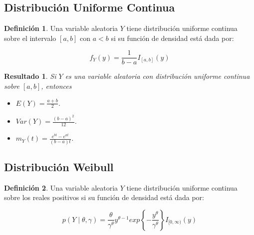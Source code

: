 \documentclass[
  10pt,
  spanish,
]{book}
\providecommand{\tightlist}{%
  \setlength{\itemsep}{0pt}\setlength{\parskip}{0pt}}
\newtheorem{proposition}{Resultado}[chapter]
\theoremstyle{definition}
\newtheorem{definition}{Definición}[chapter]
\theoremstyle{definition}
\theoremstyle{definition}
\theoremstyle{definition}
\theoremstyle{remark}
\begin{document}
\hypertarget{distribuciuxf3n-uniforme-continua}{%
\subsection{Distribución Uniforme Continua}\label{distribuciuxf3n-uniforme-continua}}

\begin{definition}
\protect\hypertarget{def:unnamed-chunk-16}{}{\label{def:unnamed-chunk-16} }Una variable aleatoria \(Y\) tiene distribución uniforme continua sobre el intervalo \([a,b]\) con \(a<b\) si su función de densidad está dada por:

\begin{equation}
f_Y(y)=\frac{1}{b-a}I_{[a,b]}(y)
\end{equation}
\end{definition}

\begin{proposition}
\protect\hypertarget{prp:unnamed-chunk-17}{}{\label{prp:unnamed-chunk-17} }Si \(Y\) es una variable aleatoria con distribución uniforme continua sobre \([a,b]\), entonces

\begin{itemize}
\tightlist
\item
  \(E(Y)=\frac{a+b}{2}\).
\item
  \(Var(Y)=\frac{(b-a)^2}{12}\).
\item
  \(m_Y(t)=\frac{e^{bt}-e^{at}}{(b-a)t}\).
\end{itemize}
\end{proposition}

\hypertarget{distribuciuxf3n-weibull}{%
\subsection{Distribución Weibull}\label{distribuciuxf3n-weibull}}

\begin{definition}
\protect\hypertarget{def:unnamed-chunk-18}{}{\label{def:unnamed-chunk-18} }Una variable aleatoria \(Y\) tiene distribución uniforme continua sobre los reales positivos si su función de densidad está dada por:

\begin{equation}
p(Y\mid \theta, \gamma)=\frac{\theta}{\gamma^\theta}y^{\theta-1}exp\left\{-\frac{y^\theta}{\gamma^\theta}  \right\}I_{[0,\infty)}(y)
\end{equation}
\end{definition}
\end{document}
